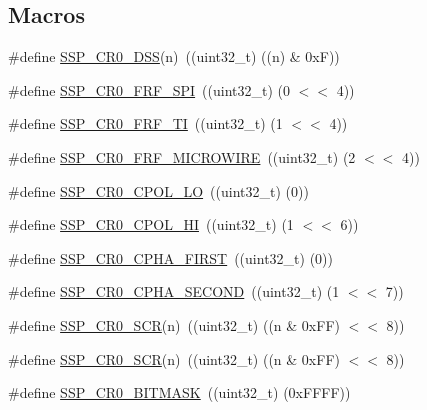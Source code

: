 \subsection*{Macros}
\begin{DoxyCompactItemize}
\item 
\#define \hyperlink{group__SSP__17XX__40XX_ga691ba9dbc6a0722a81ed4734c7f7ac8f}{S\-S\-P\-\_\-\-C\-R0\-\_\-\-D\-S\-S}(n)~((uint32\-\_\-t) ((n) \& 0x\-F))
\item 
\#define \hyperlink{group__SSP__17XX__40XX_ga4f0f58a8f4b87af0f18e84b981c31a74}{S\-S\-P\-\_\-\-C\-R0\-\_\-\-F\-R\-F\-\_\-\-S\-P\-I}~((uint32\-\_\-t) (0 $<$$<$ 4))
\item 
\#define \hyperlink{group__SSP__17XX__40XX_ga54c718a1a75a1e5e06417b9f8267ee27}{S\-S\-P\-\_\-\-C\-R0\-\_\-\-F\-R\-F\-\_\-\-T\-I}~((uint32\-\_\-t) (1 $<$$<$ 4))
\item 
\#define \hyperlink{group__SSP__17XX__40XX_ga7ca858fcf0f529a38e1e1bf0a69d4486}{S\-S\-P\-\_\-\-C\-R0\-\_\-\-F\-R\-F\-\_\-\-M\-I\-C\-R\-O\-W\-I\-R\-E}~((uint32\-\_\-t) (2 $<$$<$ 4))
\item 
\#define \hyperlink{group__SSP__17XX__40XX_gab4353fed07ef845a3796e154397f7e76}{S\-S\-P\-\_\-\-C\-R0\-\_\-\-C\-P\-O\-L\-\_\-\-L\-O}~((uint32\-\_\-t) (0))
\item 
\#define \hyperlink{group__SSP__17XX__40XX_ga36d7ad75edb14d318d710f964384f466}{S\-S\-P\-\_\-\-C\-R0\-\_\-\-C\-P\-O\-L\-\_\-\-H\-I}~((uint32\-\_\-t) (1 $<$$<$ 6))
\item 
\#define \hyperlink{group__SSP__17XX__40XX_gaee3465bdb33add1970f6ce7f7bc638c4}{S\-S\-P\-\_\-\-C\-R0\-\_\-\-C\-P\-H\-A\-\_\-\-F\-I\-R\-S\-T}~((uint32\-\_\-t) (0))
\item 
\#define \hyperlink{group__SSP__17XX__40XX_gae4150d0b2513ff70568be15c2170c9ea}{S\-S\-P\-\_\-\-C\-R0\-\_\-\-C\-P\-H\-A\-\_\-\-S\-E\-C\-O\-N\-D}~((uint32\-\_\-t) (1 $<$$<$ 7))
\item 
\#define \hyperlink{group__SSP__17XX__40XX_ga10f56047b6024ff848675f9463f1b989}{S\-S\-P\-\_\-\-C\-R0\-\_\-\-S\-C\-R}(n)~((uint32\-\_\-t) ((n \& 0x\-F\-F) $<$$<$ 8))
\item 
\#define \hyperlink{group__SSP__17XX__40XX_ga10f56047b6024ff848675f9463f1b989}{S\-S\-P\-\_\-\-C\-R0\-\_\-\-S\-C\-R}(n)~((uint32\-\_\-t) ((n \& 0x\-F\-F) $<$$<$ 8))
\item 
\#define \hyperlink{group__SSP__17XX__40XX_ga90be93bebdbdfee011d90ea6e054260a}{S\-S\-P\-\_\-\-C\-R0\-\_\-\-B\-I\-T\-M\-A\-S\-K}~((uint32\-\_\-t) (0x\-F\-F\-F\-F))
\item 
$$
\end{DoxyCompactItemize}
